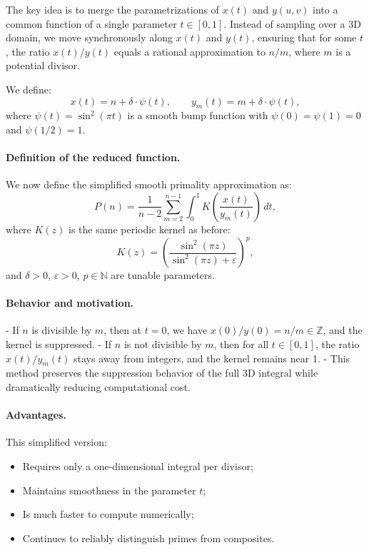 \documentclass[12pt]{article}
\theoremstyle{definition}
\theoremstyle{plain}
\theoremstyle{remark}
\begin{document}
The key idea is to merge the parametrizations of \( x(t) \) and \( y(u,v) \) into a common function of a single parameter \( t \in [0,1] \). Instead of sampling over a 3D domain, we move synchronously along \( x(t) \) and \( y(t) \), ensuring that for some \( t \), the ratio \( x(t)/y(t) \) equals a rational approximation to \( n/m \), where \( m \) is a potential divisor.

We define:
\[
x(t) = n + \delta \cdot \psi(t), \qquad y_m(t) = m + \delta \cdot \psi(t),
\]
where \( \psi(t) = \sin^2(\pi t) \) is a smooth bump function with \( \psi(0) = \psi(1) = 0 \) and \( \psi(1/2) = 1 \).

\paragraph{Definition of the reduced function.}

We now define the simplified smooth primality approximation as:
\[
P(n) = \frac{1}{n - 2} \sum_{m = 2}^{n - 1}
\int_0^1 K\left( \frac{x(t)}{y_m(t)} \right) \, dt,
\]
where \( K(z) \) is the same periodic kernel as before:
\[
K(z) = \left( \frac{\sin^2(\pi z)}{\sin^2(\pi z) + \varepsilon} \right)^p,
\]
and \( \delta > 0 \), \( \varepsilon > 0 \), \( p \in \mathbb{N} \) are tunable parameters.

\paragraph{Behavior and motivation.}

- If \( n \) is divisible by \( m \), then at \( t = 0 \), we have \( x(0)/y(0) = n/m \in \mathbb{Z} \), and the kernel is suppressed.
- If \( n \) is not divisible by \( m \), then for all \( t \in [0,1] \), the ratio \( x(t)/y_m(t) \) stays away from integers, and the kernel remains near 1.
- This method preserves the suppression behavior of the full 3D integral while dramatically reducing computational cost.

\paragraph{Advantages.}

This simplified version:
\begin{itemize}
  \item Requires only a one-dimensional integral per divisor;
  \item Maintains smoothness in the parameter \( t \);
  \item Is much faster to compute numerically;
  \item Continues to reliably distinguish primes from composites.
\end{itemize}
\end{document}
